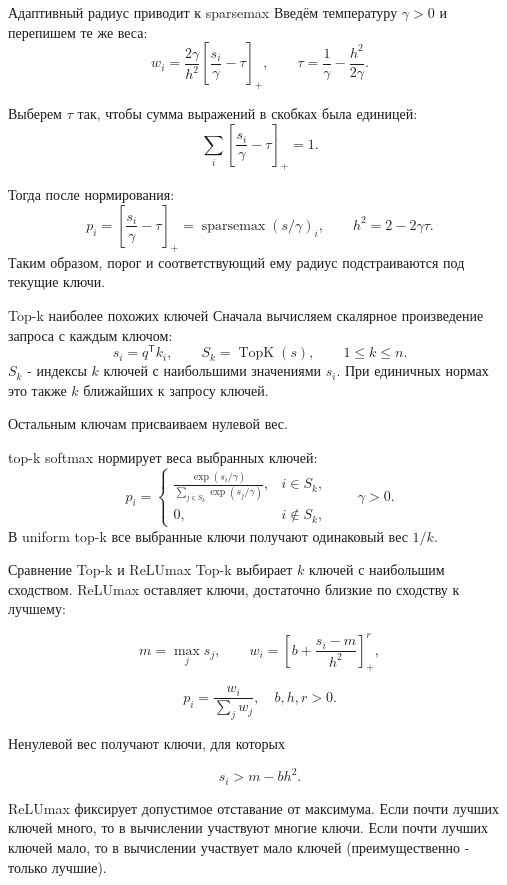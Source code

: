\documentclass[aspectratio=169,12pt]{beamer}
\newcommand{\pos}[1]{\left[#1\right]_{+}}
\begin{document}
\begin{frame}{Адаптивный радиус приводит к sparsemax}
  Введём температуру $\gamma>0$ и перепишем те же веса:
  $$
    w_i=\frac{2\gamma}{h^2}
         \pos{\frac{s_i}{\gamma}-\tau},
    \qquad \tau=\frac{1}{\gamma}-\frac{h^2}{2\gamma}.
  $$
  
  Выберем $\tau$ так, чтобы сумма выражений в скобках была единицей:
  $$
    \sum_i\pos{\frac{s_i}{\gamma}-\tau}=1.
  $$

  Тогда после нормирования:
  $$
    p_i=\pos{\frac{s_i}{\gamma}-\tau}
       =\operatorname{sparsemax}(s/\gamma)_i,
    \qquad h^2=2-2\gamma\tau.
  $$
  Таким образом, порог и соответствующий ему радиус подстраиваются под текущие ключи.
\end{frame}

\begin{frame}{Top-k наиболее похожих ключей}
  Сначала вычисляем скалярное произведение запроса с каждым ключом:
  $$
    s_i=q^{\mathsf T}k_i,\qquad
    S_k=\operatorname{TopK}(s),\qquad 1\leq k\leq n.
  $$
  $S_k$ - индексы $k$ ключей с наибольшими значениями $s_i$.
  При единичных нормах это также $k$ ближайших к запросу ключей.

  Остальным ключам присваиваем нулевой вес.
  
  top-k softmax нормирует веса выбранных ключей:
  $$
    p_i=
    \begin{cases}
      \displaystyle\frac{\exp(s_i/\gamma)}
        {\sum_{j\in S_k}\exp(s_j/\gamma)}, & i\in S_k,\\[2mm]
      0, & i\notin S_k,
    \end{cases}
    \qquad \gamma>0.
  $$
  В uniform top-k все выбранные ключи получают одинаковый вес $1/k$.
\end{frame}

\begin{frame}{Сравнение Top-k и ReLUmax}
  Top-k выбирает $k$ ключей с наибольшим сходством.
  ReLUmax оставляет ключи, достаточно близкие по сходству к лучшему:
  
  $$
    m = \max_j s_j,\qquad
    w_i = \pos{b+\frac{s_i-m}{h^2}}^r,
  $$
  
  $$
    p_i = \frac{w_i}{\sum_j w_j},\quad b,h,r>0.
  $$

  Ненулевой вес получают ключи, для которых
  
  $$
    s_i > m - bh^2.
  $$
  
  ReLUmax фиксирует допустимое отставание от максимума. 
  Если почти лучших ключей много, то в вычислении участвуют многие ключи.
  Если почти лучших ключей мало, то в вычислении участвует мало ключей (преимущественно - только лучшие).

\end{frame}
\end{document}
